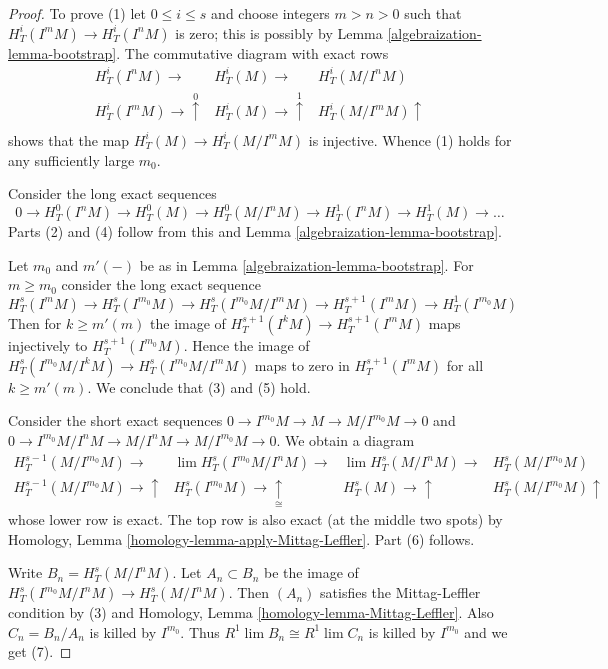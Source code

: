\begin{proof}

To prove (1) let $0 \leq i \leq s$ and choose integers $m > n > 0$ such that
$H^i_T(I^mM) \to H^i_T(I^nM)$ is zero; this is possibly by
Lemma \ref{algebraization-lemma-bootstrap}. The commutative diagram with exact rows
$$
\begin{array}{ccc}H^i_T(I^nM) \longrightarrow & H^i_T(M) \longrightarrow & H^i_T(M/I^nM) \\ H^i_T(I^mM) \longrightarrow\overset{0}{\uparrow} & H^i_T(M) \longrightarrow\overset{1}{\uparrow} & H^i_T(M/I^mM) \uparrow \\  &  & \end{array}
$$
shows that the map $H^i_T(M) \to H^i_T(M/I^mM)$ is injective. Whence (1) holds
for any sufficiently large $m_0$.

\medskip\noindent
Consider the long exact sequences
$$
0 \to H^0_T(I^nM) \to H^0_T(M) \to
H^0_T(M/I^nM) \to H^1_T(I^nM) \to
H^1_T(M) \to \ldots
$$
Parts (2) and (4) follow from this and Lemma \ref{algebraization-lemma-bootstrap}.

\medskip\noindent
Let $m_0$ and $m'(-)$ be as in Lemma \ref{algebraization-lemma-bootstrap}.
For $m \geq m_0$ consider the long exact sequence
$$
H^s_T(I^mM) \to H^s_T(I^{m_0}M) \to
H^s_T(I^{m_0}M/I^mM) \to H^{s + 1}_T(I^mM) \to
H^1_T(I^{m_0}M)
$$
Then for $k \geq m'(m)$ the image of
$H^{s + 1}_T(I^kM) \to H^{s + 1}_T(I^mM)$
maps injectively to $H^{s + 1}_T(I^{m_0}M)$.
Hence the image of
$H^s_T(I^{m_0}M/I^kM) \to H^s_T(I^{m_0}M/I^mM)$
maps to zero in $H^{s + 1}_T(I^mM)$ for all $k \geq m'(m)$.
We conclude that (3) and (5) hold.

\medskip\noindent
Consider the short exact sequences
$0 \to I^{m_0}M \to M \to M/I^{m_0} M \to 0$ and
$0 \to I^{m_0}M/I^nM \to M/I^nM \to M/I^{m_0} M \to 0$.
We obtain a diagram
$$
\begin{array}{cccc}H^{s - 1}_T(M/I^{m_0}M) \longrightarrow & \lim H^s_T(I^{m_0}M/I^nM) \longrightarrow & \lim H^s_T(M/I^nM) \longrightarrow & H^s_T(M/I^{m_0}M) \\ H^{s - 1}_T(M/I^{m_0}M) \longrightarrow\uparrow & H^s_T(I^{m_0}M) \longrightarrow\underset{\cong}{\uparrow} & H^s_T(M) \longrightarrow\uparrow & H^s_T(M/I^{m_0}M) \uparrow\end{array}
$$
whose lower row is exact. The top row is also exact
(at the middle two spots) by
Homology, Lemma \ref{homology-lemma-apply-Mittag-Leffler}.
Part (6) follows.

\medskip\noindent
Write $B_n = H^s_T(M/I^nM)$. Let $A_n \subset B_n$
be the image of $H^s_T(I^{m_0}M/I^nM) \to H^s_T(M/I^nM)$.
Then $(A_n)$ satisfies the Mittag-Leffler condition by (3) and
Homology, Lemma \ref{homology-lemma-Mittag-Leffler}.
Also $C_n = B_n/A_n$ is killed by $I^{m_0}$. Thus
$R^1\lim B_n \cong R^1\lim C_n$ is killed by $I^{m_0}$ and we get (7).
\end{proof}

